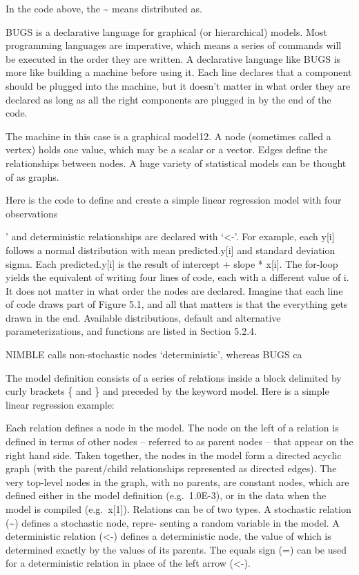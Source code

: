 \documentclass[
  12pt,
]{krantz}
\begin{document}
In the code above, the \textasciitilde{} means distributed as.

BUGS is a declarative language for graphical (or hierarchical) models. Most programming languages are imperative, which means a series of commands will be executed in the order they are written. A declarative language like BUGS is more like building a machine before using it. Each line declares that a component should be plugged into the machine, but it doesn't matter in what order they are declared as long as all the right components are plugged in by the end of the code.

The machine in this case is a graphical model12. A node (sometimes called a vertex) holds one value, which may be a scalar or a vector. Edges define the relationships between nodes. A huge variety of statistical models can be thought of as graphs.

Here is the code to define and create a simple linear regression model with four observations

' and deterministic relationships are declared with `\textless-'. For example, each y{[}i{]} follows a normal distribution with mean predicted.y{[}i{]} and standard deviation sigma. Each predicted.y{[}i{]} is the result of intercept + slope * x{[}i{]}. The for-loop yields the equivalent of writing four lines of code, each with a different value of i. It does not matter in what order the nodes are declared. Imagine that each line of code draws part of Figure 5.1, and all that matters is that the everything gets drawn in the end. Available distributions, default and alternative parameterizations, and functions are listed in Section 5.2.4.

NIMBLE calls non-stochastic nodes `deterministic', whereas BUGS ca

The model definition consists of a series of relations inside a block delimited by curly brackets \{ and \} and preceded by the keyword model. Here is a simple linear regression example:

Each relation defines a node in the model. The node on the left of a relation is defined in
terms of other nodes -- referred to as parent nodes -- that appear on the right hand side.
Taken together, the nodes in the model form a directed acyclic graph (with the parent/child
relationships represented as directed edges). The very top-level nodes in the graph, with no
parents, are constant nodes, which are defined either in the model definition (e.g.~1.0E-3),
or in the data when the model is compiled (e.g.~x{[}1{]}).
Relations can be of two types. A stochastic relation (\textasciitilde) defines a stochastic node, repre-
senting a random variable in the model. A deterministic relation (\textless-) defines a deterministic
node, the value of which is determined exactly by the values of its parents. The equals sign
(=) can be used for a deterministic relation in place of the left arrow (\textless-).
\end{document}
